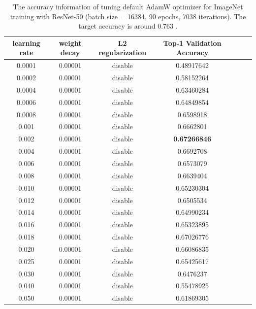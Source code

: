 \begin{table}[ht]
\renewcommand{\arraystretch}{1.3}
\caption{The accuracy information of tuning default AdamW optimizer for ImageNet training with ResNet-50 (batch size = 16384, 90 epochs, 7038 iterations). The target accuracy is around 0.763 \citep{goyal2017accurate}.}
\centering
\begin{tabular}{|c|c|c|c|c|c|c|}
\hline
learning rate & weight decay & L2 regularization & Top-1 Validation Accuracy\\
\hline
\hline
0.0001 & 0.00001 & disable & 0.48917642 \\
\hline
0.0002 & 0.00001 & disable & 0.58152264 \\
\hline
0.0004 & 0.00001 & disable & 0.63460284 \\
\hline
0.0006 & 0.00001 & disable & 0.64849854 \\
\hline
0.0008 & 0.00001 & disable & 0.6598918 \\
\hline
0.001 & 0.00001 & disable & 0.6662801 \\
\hline
0.002 & 0.00001 & disable & {\bf 0.67266846} \\
\hline
0.004 & 0.00001 & disable & 0.6692708 \\
\hline
0.006 & 0.00001 & disable & 0.6573079 \\
\hline
0.008 & 0.00001 & disable & 0.6639404 \\
\hline
0.010 & 0.00001 & disable & 0.65230304 \\
\hline
0.012 & 0.00001 & disable & 0.6505534 \\
\hline
0.014 & 0.00001 & disable & 0.64990234 \\
\hline
0.016 & 0.00001 & disable & 0.65323895 \\
\hline
0.018 & 0.00001 & disable & 0.67026776 \\
\hline
0.020 & 0.00001 & disable & 0.66086835 \\
\hline
0.025 & 0.00001 & disable & 0.65425617 \\
\hline
0.030 & 0.00001 & disable & 0.6476237 \\
\hline
0.040 & 0.00001 & disable & 0.55478925 \\
\hline
0.050 & 0.00001 & disable & 0.61869305 \\
\hline
\end{tabular}
\label{table:imagenet_adamw_default_1}
\end{table}


